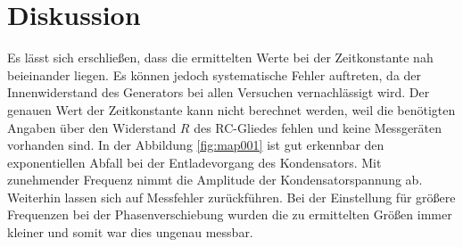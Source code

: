 \section{Diskussion}
\label{sec:Diskussion}
Es lässt sich erschließen, dass die ermittelten Werte bei der Zeitkonstante nah beieinander liegen.
Es können jedoch systematische Fehler auftreten, da der Innenwiderstand des Generators bei allen Versuchen vernachlässigt wird. Der genauen Wert der Zeitkonstante kann nicht berechnet werden, weil die benötigten Angaben über den Widerstand $R$ des RC-Gliedes fehlen und keine Messgeräten vorhanden sind.
In der Abbildung \ref{fig:map001} ist gut erkennbar den exponentiellen Abfall bei der Entladevorgang des Kondensators. Mit zunehmender Frequenz nimmt die Amplitude der Kondensatorspannung ab. 
Weiterhin lassen sich auf Messfehler zurückführen. Bei der Einstellung für größere Frequenzen bei der Phasenverschiebung wurden die zu ermittelten Größen immer kleiner und somit war dies ungenau messbar.  
